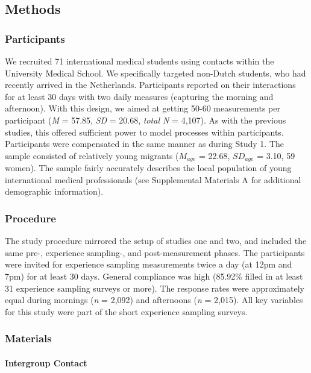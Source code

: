 \subsection{Methods}

\subsubsection{Participants}

We recruited 71 international medical students using contacts within the
University Medical School. We specifically targeted non-Dutch students,
who had recently arrived in the Netherlands. Participants reported on
their interactions for at least 30 days with two daily measures
(capturing the morning and afternoon). With this design, we aimed at
getting 50-60 measurements per participant (\textit{M} = 57.85,
\textit{SD} = 20.68, \textit{total N} = 4,107). As with the previous
studies, this offered sufficient power to model processes within
participants. Participants were compensated in the same manner as during
Study 1. The sample consisted of relatively young migrants (\(M_{age}\)
= 22.68, \(SD_{age}\) = 3.10, 59 women). The sample fairly accurately
describes the local population of young international medical
professionals (see Supplemental Materials A for additional demographic
information).

\subsubsection{Procedure}

The study procedure mirrored the setup of studies one and two, and
included the same pre-, experience sampling-, and post-measurement
phases. The participants were invited for experience sampling
measurements twice a day (at 12pm and 7pm) for at least 30 days. General
compliance was high (85.92\% filled in at least 31 experience sampling
surveys or more). The response rates were approximately equal during
mornings (\textit{n} = 2,092) and afternoons (\textit{n} = 2,015). All
key variables for this study were part of the short experience sampling
surveys.

\subsubsection{Materials}

\paragraph{Intergroup Contact}

